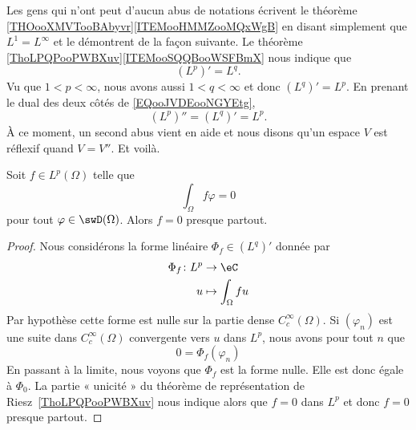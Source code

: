 \begin{normaltext}
	Les gens qui n'ont peut d'aucun abus de notations écrivent le théorème \ref{THOooXMVTooBAbyvr}\ref{ITEMooHMMZooMQxWgB} en disant simplement que \( L^1=L^{\infty}\) et le démontrent de la façon suivante. Le théorème \ref{ThoLPQPooPWBXuv}\ref{ITEMooSQQBooWSFBmX} nous indique que
	\begin{equation}        \label{EQooJVDEooNGYEtg}
		(L^p)'=L^q.
	\end{equation}
	Vu que \( 1<p<\infty\), nous avons aussi \( 1<q<\infty\) et donc \( (L^q)'=L^p\). En prenant le dual des deux côtés de \eqref{EQooJVDEooNGYEtg},
	\begin{equation}
		(L^p)''=(L^q)'=L^p.
	\end{equation}
	À ce moment, un second abus vient en aide et nous disons qu'un espace \( V\) est réflexif quand \( V=V''\). Et voilà.
\end{normaltext}


\begin{proposition} \label{PropUKLZZZh}
	Soit \( f\in L^p(\Omega)\) telle que
	\begin{equation}
		\int_{\Omega}f\varphi=0
	\end{equation}
	pour tout \( \varphi\in \swD(\Omega)\). Alors \( f=0\) presque partout.
\end{proposition}

\begin{proof}
	Nous considérons la forme linéaire \( \Phi_f\in (L^q)'\) donnée par
	\begin{equation}
		\begin{aligned}
			\Phi_f\colon L^p & \to \eC                 \\
			u                & \mapsto \int_{\Omega}fu
		\end{aligned}
	\end{equation}
	Par hypothèse cette forme est nulle sur la partie dense \(  C^{\infty}_c(\Omega)\). Si \( (\varphi_n)\) est une suite dans \(  C^{\infty}_c(\Omega)\) convergente vers \( u\) dans \( L^p\), nous avons pour tout \( n\) que
	\begin{equation}
		0=\Phi_f(\varphi_n)
	\end{equation}
	En passant à la limite, nous voyons que \( \Phi_f\) est la forme nulle. Elle est donc égale à \( \Phi_0\). La partie « unicité » du théorème de représentation de Riesz~\ref{ThoLPQPooPWBXuv} nous indique alors que \( f=0\) dans \( L^p\) et donc \( f=0\) presque partout.
\end{proof}

